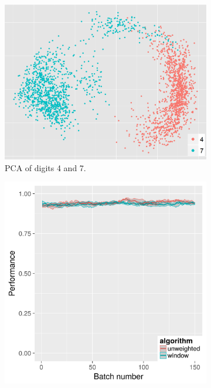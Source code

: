 \begin{figure}[H]
\begin{subfigure}{.3\textwidth}
  \centering
  \includegraphics[width=\linewidth]{PCA_pendigits_pairwise/pairwise_4_7_cropped.png}
  \caption{PCA of digits 4 and 7.}
\end{subfigure}%
\begin{subfigure}{.3\textwidth}
  \centering
  \includegraphics[width=\linewidth]{pendigits_2_alg/uci_pendigits_47_ci_one_size_purity.png}

\end{subfigure}
\end{figure}
